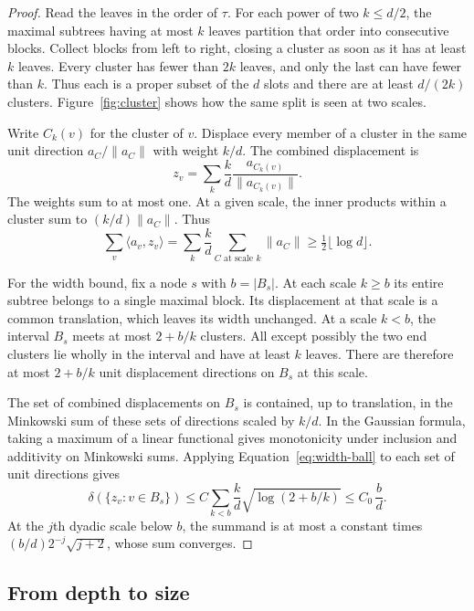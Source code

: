 \begin{proof}
Read the leaves in the order of $\tau$. For each power of two $k\le d/2$,
the maximal subtrees having at most $k$ leaves partition that order into
consecutive blocks. Collect blocks from left to right, closing a cluster
as soon as it has at least $k$ leaves. Every cluster has fewer than
$2k$ leaves, and only the last can have fewer than $k$. Thus each is a
proper subset of the $d$ slots and there are at least $d/(2k)$ clusters.
Figure~\ref{fig:cluster} shows how the same split is seen at two scales.



Write $C_k(v)$ for the cluster of $v$. Displace every member of a
cluster in the same unit direction $a_C/\|a_C\|$ with weight $k/d$.
The combined displacement is
\[
            z_v=\sum_k\frac{k}{d}\frac{a_{C_k(v)}}{\|a_{C_k(v)}\|}.
\]
The weights sum to at most one. At a given scale, the inner products
within a cluster sum to $(k/d)\|a_C\|$. Thus
\[
       \sum_v\langle a_v,z_v\rangle
         =\sum_k\frac{k}{d}\sum_{C\text{ at scale }k}\|a_C\|
         \ge \tfrac12\lfloor\log d\rfloor .
\]

For the width bound, fix a node $s$ with $b=|B_s|$. At each scale
$k\ge b$ its entire subtree belongs to a single maximal block. Its
displacement at that scale is a common translation, which leaves its
width unchanged. At a scale $k<b$, the interval $B_s$ meets at most
$2+b/k$ clusters. All except possibly the two end clusters lie wholly
in the interval and have at least $k$ leaves. There are therefore at
most $2+b/k$ unit displacement directions on $B_s$ at this scale.

The set of combined displacements on $B_s$ is contained, up to
translation, in the Minkowski sum of these sets of directions scaled
by $k/d$. In the Gaussian formula, taking a maximum of a linear
functional gives monotonicity under inclusion and additivity on
Minkowski sums. Applying Equation~\eqref{eq:width-ball} to each set
of unit directions gives
\[
       \delta(\{z_v:v\in B_s\})
          \le C\sum_{k<b}\frac{k}{d}\sqrt{\log(2+b/k)}
          \le C_0\,\frac{b}{d}.
\]
At the $j$th dyadic scale below $b$, the summand is at most a
constant times $(b/d)2^{-j}\sqrt{j+2}$, whose sum converges.
\end{proof}

\subsection{From depth to size}


